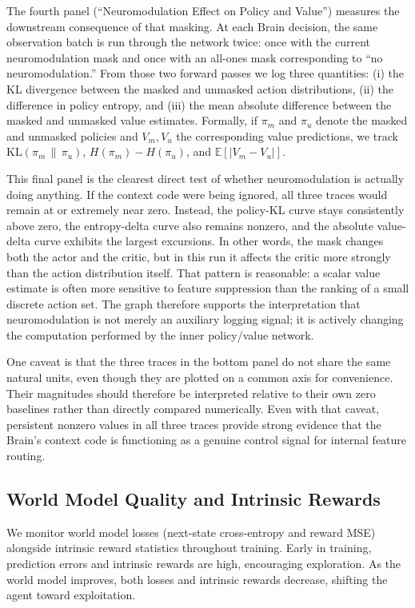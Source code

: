 ﻿\documentclass[sigconf]{acmart}
\begin{document}
The fourth panel (``Neuromodulation Effect on Policy and Value'') measures the downstream consequence of that masking. At each Brain decision, the same observation batch is run through the network twice: once with the current neuromodulation mask and once with an all-ones mask corresponding to ``no neuromodulation.'' From those two forward passes we log three quantities: (i) the KL divergence between the masked and unmasked action distributions, (ii) the difference in policy entropy, and (iii) the mean absolute difference between the masked and unmasked value estimates. Formally, if $\pi_m$ and $\pi_u$ denote the masked and unmasked policies and $V_m, V_u$ the corresponding value predictions, we track $\mathrm{KL}(\pi_m\,\|\,\pi_u)$, $H(\pi_m)-H(\pi_u)$, and $\mathbb{E}[|V_m-V_u|]$.

This final panel is the clearest direct test of whether neuromodulation is actually doing anything. If the context code were being ignored, all three traces would remain at or extremely near zero. Instead, the policy-KL curve stays consistently above zero, the entropy-delta curve also remains nonzero, and the absolute value-delta curve exhibits the largest excursions. In other words, the mask changes both the actor and the critic, but in this run it affects the critic more strongly than the action distribution itself. That pattern is reasonable: a scalar value estimate is often more sensitive to feature suppression than the ranking of a small discrete action set. The graph therefore supports the interpretation that neuromodulation is not merely an auxiliary logging signal; it is actively changing the computation performed by the inner policy/value network.

One caveat is that the three traces in the bottom panel do not share the same natural units, even though they are plotted on a common axis for convenience. Their magnitudes should therefore be interpreted relative to their own zero baselines rather than directly compared numerically. Even with that caveat, persistent nonzero values in all three traces provide strong evidence that the Brain's context code is functioning as a genuine control signal for internal feature routing.

\subsection{World Model Quality and Intrinsic Rewards}
We monitor world model losses (next-state cross-entropy and reward MSE) alongside intrinsic reward statistics throughout training. Early in training, prediction errors and intrinsic rewards are high, encouraging exploration. As the world model improves, both losses and intrinsic rewards decrease, shifting the agent toward exploitation.
\end{document}
